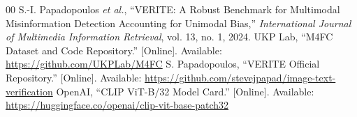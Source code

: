 \documentclass[conference]{IEEEtran}
\begin{document}
\begin{thebibliography}{00}
 S.-I. Papadopoulos \emph{et al.}, ``VERITE: A Robust Benchmark for Multimodal Misinformation Detection Accounting for Unimodal Bias,'' \emph{International Journal of Multimedia Information Retrieval}, vol. 13, no. 1, 2024.
 UKP Lab, ``M4FC Dataset and Code Repository.'' [Online]. Available: \url{https://github.com/UKPLab/M4FC}
 S. Papadopoulos, ``VERITE Official Repository.'' [Online]. Available: \url{https://github.com/stevejpapad/image-text-verification}
 OpenAI, ``CLIP ViT-B/32 Model Card.'' [Online]. Available: \url{https://huggingface.co/openai/clip-vit-base-patch32}
\end{thebibliography}
\end{document}
